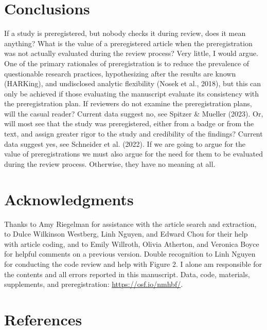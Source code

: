 \documentclass[authordate, meta]{jote-new-article}
\begin{document}
	\section{Conclusions}



	If a study is preregistered, but nobody checks it during review, does it mean anything? What is the value of a preregistered article when the preregistration was not actually evaluated during the review process? Very little, I would argue. One of the primary rationales of preregistration is to reduce the prevalence of questionable research practices, hypothesizing after the results are known (HARKing), and undisclosed analytic flexibility (Nosek et al., 2018), but this can only be achieved if those evaluating the manuscript evaluate its consistency with the preregistration plan. If reviewers do not examine the preregistration plans, will the casual reader? Current data suggest no, see Spitzer \& Mueller (2023). Or, will most see that the study was preregistered, either from a badge or from the text, and assign greater rigor to the study and credibility of the findings? Current data suggest yes, see Schneider et al. (2022). If we are going to argue for the value of preregistrations we must also argue for the need for them to be evaluated during the review process. Otherwise, they have no meaning at all.



	\section{Acknowledgments}



	Thanks to Amy Riegelman for assistance with the article search and extraction, to Dulce Wilkinson Westberg, Linh Nguyen, and Edward Chou for their help with article coding, and to Emily Willroth, Olivia Atherton, and Veronica Boyce for helpful comments on a previous version. Double recognition to Linh Nguyen for conducting the code review and help with Figure 2. I alone am responsible for the contents and all errors reported in this manuscript. Data, code, materials, supplements, and preregistration: \url{https://osf.io/nmhbf/}.







	\section{References}
\end{document}

